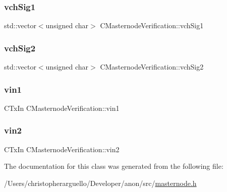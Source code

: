 \subsubsection{\texorpdfstring{vch\+Sig1}{vchSig1}}
{\footnotesize\ttfamily std\+::vector$<$unsigned char$>$ C\+Masternode\+Verification\+::vch\+Sig1}

\mbox{\label{class_c_masternode_verification_a74ee12a431a4a86c50150c91e766650a}} 
\subsubsection{\texorpdfstring{vch\+Sig2}{vchSig2}}
{\footnotesize\ttfamily std\+::vector$<$unsigned char$>$ C\+Masternode\+Verification\+::vch\+Sig2}

\mbox{\label{class_c_masternode_verification_acc23b066c0499f95f551ef623260a8af}} 
\subsubsection{\texorpdfstring{vin1}{vin1}}
{\footnotesize\ttfamily C\+Tx\+In C\+Masternode\+Verification\+::vin1}

\mbox{\label{class_c_masternode_verification_a0f64c4ac055701ee05946e0a6d3675fa}} 
\subsubsection{\texorpdfstring{vin2}{vin2}}
{\footnotesize\ttfamily C\+Tx\+In C\+Masternode\+Verification\+::vin2}



The documentation for this class was generated from the following file\+:\begin{DoxyCompactItemize}
\item 
/\+Users/christopherarguello/\+Developer/anon/src/\mbox{\hyperlink{masternode_8h}{masternode.\+h}}\end{DoxyCompactItemize}
